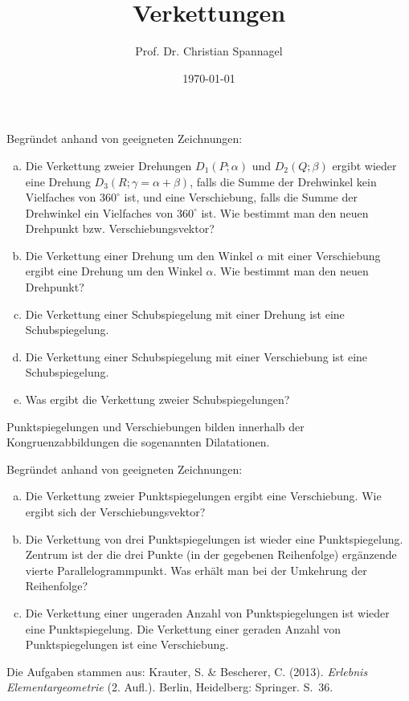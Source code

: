 \documentclass{cssheet}
\title{Verkettungen}
\author{Prof. Dr. Christian Spannagel}
\date{\today}
\begin{document}
\printtitle

\begin{aufgabe}

Begründet anhand von geeigneten Zeichnungen: 
\begin{enumerate}[a)]
\item Die Verkettung zweier Drehungen $D_{1}(P;\alpha)$ und $D_{2}(Q;\beta)$ ergibt wieder eine Drehung $D_{3}(R;\gamma=\alpha+\beta)$, falls die Summe der Drehwinkel kein Vielfaches von $360^{\circ}$ ist, und eine Verschiebung, falls die Summe der Drehwinkel ein Vielfaches von $360^{\circ}$ ist. Wie bestimmt man den neuen Drehpunkt bzw. Verschiebungsvektor?
\item Die Verkettung einer Drehung um den Winkel $\alpha$ mit einer Verschiebung ergibt eine Drehung um den Winkel $\alpha$. Wie bestimmt man den neuen Drehpunkt?
\item Die Verkettung einer Schubspiegelung mit einer Drehung ist eine Schubspiegelung.
\item Die Verkettung einer Schubspiegelung mit einer Verschiebung ist eine Schubspiegelung.
\item Was ergibt die Verkettung zweier Schubspiegelungen?

\end{enumerate}
\end{aufgabe}

\begin{aufgabe}[Dilatationen]

Punktspiegelungen und Verschiebungen bilden innerhalb der Kongruenzabbildungen die sogenannten Dilatationen.

Begründet anhand von geeigneten Zeichnungen: 
\begin{enumerate}[a)]
	\item Die Verkettung zweier Punktspiegelungen ergibt eine Verschiebung. Wie ergibt sich der Verschiebungsvektor?
	\item Die Verkettung von drei Punktspiegelungen ist wieder eine Punktspiegelung. Zentrum ist der die drei Punkte (in der gegebenen Reihenfolge) ergänzende vierte Parallelogrammpunkt. Was erhält man bei der Umkehrung der Reihenfolge?
	\item Die Verkettung einer ungeraden Anzahl von Punktspiegelungen ist wieder eine Punktspiegelung. Die Verkettung einer geraden Anzahl von Punktspiegelungen ist eine Verschiebung.
\end{enumerate}
\end{aufgabe}

Die Aufgaben stammen aus: Krauter, S. \& Bescherer, C. (2013). \emph{Erlebnis Elementargeometrie} (2. Aufl.). Berlin, Heidelberg: Springer. S.~36.

\vspace*{10mm}

\printlicense

\printsocials
\end{document}
